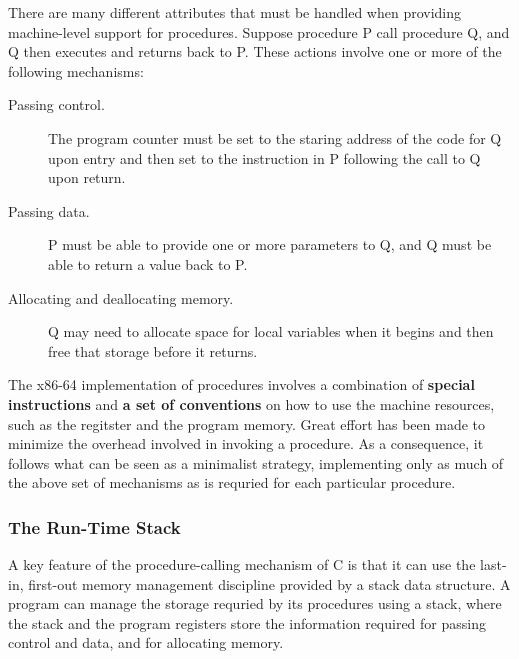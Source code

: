 \documentclass[11pt]{article}
\begin{document}
There are many different attributes that must be handled when providing machine-level support for procedures. Suppose procedure P call procedure Q, and Q then executes and returns back to P. These actions involve one or more of the following mechanisms:\\
\begin{description}
\item[{Passing control.}] The program counter must be set to the staring address of the code for Q upon entry and then set to the instruction in P following the call to Q upon return.\\
\item[{Passing data.}] P must be able to provide one or more parameters to Q, and Q must be able to return a value back to P.\\
\item[{Allocating and deallocating memory.}] Q may need to allocate space for local variables when it begins and then free that storage before it returns.\\
\end{description}

The x86-64 implementation of procedures involves a combination of \textbf{special instructions} and \textbf{a set of conventions} on how to use the machine resources, such as the regitster and the program memory. Great effort has been made to minimize the overhead involved in invoking a procedure. As a consequence, it follows what can be seen as a minimalist strategy, implementing only as much of the above set of mechanisms as is requried for each particular procedure.\\


\subsubsection{The Run-Time Stack}
\label{sec:org186bb48}
A key feature of the procedure-calling mechanism of C is that it can use the last-in, first-out memory management discipline provided by a stack data structure. A program can manage the storage requried by its procedures using a stack, where the stack and the program registers store the information required for passing control and data, and for allocating memory.\\
\end{document}
